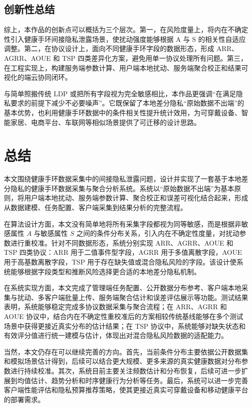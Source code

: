 \documentclass{cumcmthesis}
\numberwithin{equation}{section}
\numberwithin{figure}{section}
\numberwithin{table}{section}
\begin{document}
\subsection{创新性总结}

综上，本作品的创新点可以概括为三个层次。第一，在风险度量上，将内在不确定性引入健康手环间接隐私泄露场景，使扰动强度能够根据 A 与 S 的相关性自适应调整。第二，在协议设计上，面向不同健康手环字段的数据形态，形成 ARR、AGRR、AOUE 和 TSP 四类差异化方案，避免用单一协议处理所有问题。第三，在工程实现上，构建服务端参数计算、用户端本地扰动、服务端聚合校正和结果可视化的端云协同闭环。

与简单照搬传统 LDP 或把所有字段视为完全敏感相比，本作品更强调“在满足隐私要求的前提下减少不必要噪声”。它既保留了本地差分隐私“原始数据不出端”的基本优势，也利用健康手环数据中的条件相关性提升统计效用，为可穿戴设备、智能家居、电商平台、车联网等相似场景提供了可迁移的设计思路。

\clearpage
\section{总结}

本文围绕健康手环数据采集中的间接隐私泄露问题，设计并实现了一套基于本地差分隐私的健康手环数据采集与聚合分析系统。系统以“原始数据不出端”为基本原则，将用户端本地扰动、服务端参数计算、聚合校正和误差可视化结合起来，形成从数据建模、任务配置、客户端采集到结果分析的完整流程。

在算法设计方面，本文没有简单地将所有采集字段都视为同等敏感，而是根据非敏感属性 $A$ 与敏感属性 $S$ 之间的条件分布关系，引入内在不确定性度量，对扰动参数进行重校准。针对不同数据形态，系统分别实现 ARR、AGRR、AOUE 和 TSP 四类协议：ARR 用于二值事件型字段，AGRR 用于多值离散字段，AOUE 用于高基数离散字段，TSP 用于存在缺失值或混合隐私风险的字段。该设计使系统能够根据字段类型和推断风险选择更合适的本地差分隐私机制。

在系统实现方面，本文完成了管理端任务配置、公开数据分布参考、客户端本地采集与扰动、多客户端批量上传、服务端聚合估计和误差评估展示等功能。测试结果表明，系统能够稳定完成多协议数据采集与聚合流程；在 ARR、AGRR 和 AOUE 协议中，结合内在不确定性重校准后的方案相较传统基线能够在多个测试场景中获得更接近真实分布的估计结果；在 TSP 协议中，系统能够对缺失状态和有效评分值进行统一建模与估计，体现出对混合隐私风险数据的适配能力。

当然，本文仍存在可以继续完善的方向。首先，当前条件分布主要依据公开数据集和模拟场景估计得到，后续可以结合更大规模、更多来源的真实健康数据对分布参数进行持续校准。其次，系统目前主要关注频数估计和分布恢复，后续可进一步扩展到均值估计、趋势分析和时序健康行为分析等任务。最后，系统可以进一步完善客户端性能评估和隐私预算推荐策略，使其更接近真实可穿戴设备和移动健康平台的部署需求。
\end{document}
